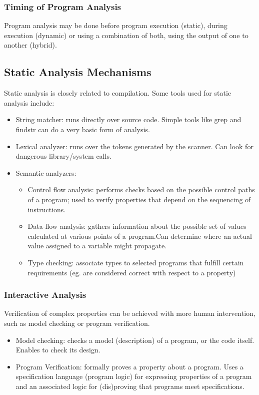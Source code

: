 \documentclass[10pt,a4paper]{report}
\begin{document}
\subsubsection{Timing of Program Analysis}
Program analysis may be done before program execution (static), during execution (dynamic) or using a combination of both, using the output of one to another (hybrid).
\subsection{Static Analysis Mechanisms}
Static analysis is closely related to compilation. Some tools used for static analysis include:
\begin{itemize}
\item String matcher: runs directly over source code. Simple tools like grep and findstr can do a very basic form of analysis.
\item Lexical analyzer: runs over the tokens generated by the scanner. Can look for dangerous library/system calls.
\item Semantic analyzers:
\begin{itemize}
\item Control flow analysis:  performs checks based on the possible control paths of a program; used to verify  properties that depend on the sequencing of instructions.
\item Data-flow analysis: gathers information about the possible set of values calculated at various points of a program.Can determine where an actual value assigned to a variable might propagate.
\item Type checking: associate types to selected programs that fulfill certain requirements (eg. are considered correct with respect to a property)
\end{itemize}
\end{itemize}
\subsubsection{Interactive Analysis}
Verification of complex properties can be achieved with more human intervention, such as model checking or program verification.
\begin{itemize}
\item Model checking: checks a model (description) of a program, or the code itself. Enables to check its design.
\item Program Verification: formally proves a property about a program. Uses a specification language (program logic) for expressing properties of a program and an associated logic for (dis)proving that programs meet specifications.
\end{itemize}
\end{document}
